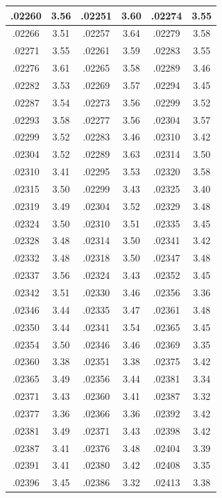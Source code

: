 \documentclass[10pt,twoside]{report}
\begin{document}
\begin{appendices}
\begin{longtable}{|c|c||c|c||c|c|}
.02260 & 3.56 & .02251 & 3.60 & .02274 & 3.55\\\hline
.02266 & 3.51 & .02257 & 3.64 & .02279 & 3.58\\\hline
.02271 & 3.55 & .02261 & 3.59 & .02283 & 3.55\\\hline
.02276 & 3.61 & .02265 & 3.58 & .02289 & 3.46\\\hline
.02282 & 3.53 & .02269 & 3.57 & .02294 & 3.45\\\hline
.02287 & 3.54 & .02273 & 3.56 & .02299 & 3.52\\\hline
.02293 & 3.58 & .02277 & 3.56 & .02304 & 3.57\\\hline
.02299 & 3.52 & .02283 & 3.46 & .02310 & 3.42\\\hline
.02304 & 3.52 & .02289 & 3.63 & .02314 & 3.50\\\hline
.02310 & 3.41 & .02295 & 3.53 & .02320 & 3.58\\\hline
.02315 & 3.50 & .02299 & 3.43 & .02325 & 3.40\\\hline
.02319 & 3.49 & .02304 & 3.52 & .02329 & 3.48\\\hline
.02324 & 3.50 & .02310 & 3.51 & .02335 & 3.45\\\hline
.02328 & 3.48 & .02314 & 3.50 & .02341 & 3.42\\\hline
.02332 & 3.48 & .02318 & 3.50 & .02347 & 3.48\\\hline
.02337 & 3.56 & .02324 & 3.43 & .02352 & 3.45\\\hline
.02342 & 3.51 & .02330 & 3.46 & .02356 & 3.36\\\hline
.02346 & 3.44 & .02335 & 3.47 & .02361 & 3.48\\\hline
.02350 & 3.44 & .02341 & 3.54 & .02365 & 3.45\\\hline
.02354 & 3.50 & .02346 & 3.46 & .02369 & 3.35\\\hline
.02360 & 3.38 & .02351 & 3.38 & .02375 & 3.42\\\hline
.02365 & 3.49 & .02356 & 3.44 & .02381 & 3.34\\\hline
.02371 & 3.43 & .02360 & 3.41 & .02387 & 3.32\\\hline
.02377 & 3.36 & .02366 & 3.36 & .02392 & 3.42\\\hline
.02381 & 3.49 & .02371 & 3.43 & .02398 & 3.42\\\hline
.02387 & 3.41 & .02376 & 3.48 & .02404 & 3.39\\\hline
.02391 & 3.41 & .02380 & 3.42 & .02408 & 3.35\\\hline
.02396 & 3.45 & .02386 & 3.32 & .02413 & 3.38\\\hline

\end{longtable}
\end{appendices}
\end{document}
